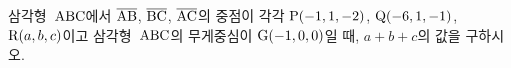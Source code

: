 삼각형~$\mathrm{ABC}$에서 $\overline{\mathrm{AB}}$, $\overline{\mathrm{BC}}$, $\overline{\mathrm{AC}}$의 중점이 각각 $\mathrm{P}(-1{,}\mkern3mu\mathopen{}1{,}\mkern3mu\mathopen{}-2)$, $\mathrm{Q}(-6{,}\mkern3mu\mathopen{}1{,}\mkern3mu\mathopen{}-1)$, $\mathrm{R}(a{,}\mkern3mu\mathopen{}b{,}\mkern3mu\mathopen{}c)$이고 삼각형~$\mathrm{ABC}$의 무게중심이 $\mathrm{G}(-1{,}\mkern3mu\mathopen{}0{,}\mkern3mu\mathopen{}0)$일 때, $a+b+c$의 값을 구하시오.

